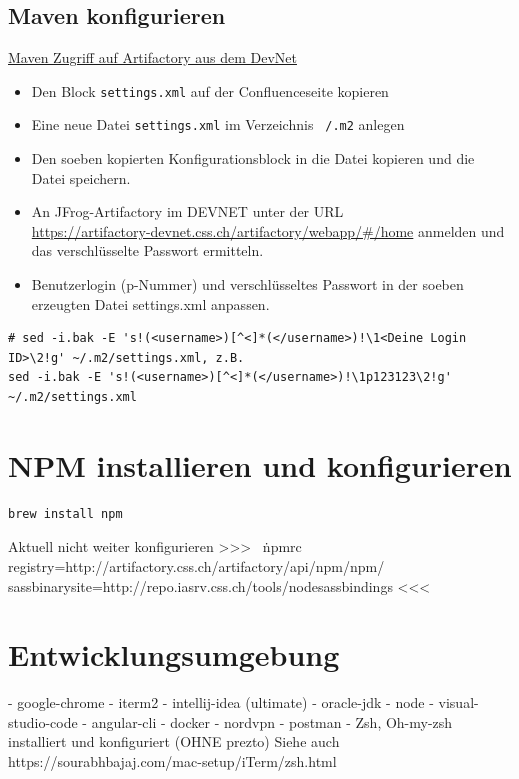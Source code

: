 \documentclass[]{article}
\newcommand{\code}[1]{\texttt{#1}}
\begin{document}
\subsection{Maven konfigurieren}
\href{https://confluence.css.ch/confluence/display/TEA/Maven+Zugriff+auf+Artifactory+aus+dem+DevNet}{Maven Zugriff auf Artifactory aus dem DevNet}
\begin{itemize}
	\item Den Block \code{settings.xml} auf der Confluenceseite kopieren
	\item Eine neue Datei \code{settings.xml} im Verzeichnis \code{~/.m2} anlegen
	\item Den soeben kopierten Konfigurationsblock in die Datei kopieren und die Datei speichern.
	\item An JFrog-Artifactory im DEVNET unter der URL \\
	\url{https://artifactory-devnet.css.ch/artifactory/webapp/#/home}
	anmelden und das verschlüsselte Passwort ermitteln.
	\item Benutzerlogin (p-Nummer) und verschlüsseltes Passwort in der soeben erzeugten Datei settings.xml anpassen.
\end{itemize}

\begin{verbatim}
# sed -i.bak -E 's!(<username>)[^<]*(</username>)!\1<Deine Login ID>\2!g' ~/.m2/settings.xml, z.B.
sed -i.bak -E 's!(<username>)[^<]*(</username>)!\1p123123\2!g' ~/.m2/settings.xml
\end{verbatim}



\section{NPM installieren und konfigurieren}
\begin{verbatim}
brew install npm
\end{verbatim}

Aktuell nicht weiter konfigurieren >>>
~\.npmrc
registry=http://artifactory.css.ch/artifactory/api/npm/npm/
sass\textunderscore binary\textunderscore site=http://repo.iasrv.css.ch/tools/node\textunderscore sass\textunderscore bindings
<<<

\section{Entwicklungsumgebung}
    - google-chrome
- iterm2
- intellij-idea (ultimate)
- oracle-jdk
- node
- visual-studio-code
- angular-cli
- docker
- nordvpn
- postman
- Zsh, Oh-my-zsh installiert und konfiguriert (OHNE prezto)
Siehe auch https://sourabhbajaj.com/mac-setup/iTerm/zsh.html
\end{document}
